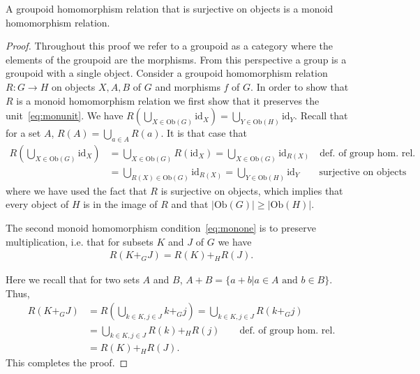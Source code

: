 \begin{lemma}
\label{lem:mongrphom}
A groupoid homomorphism relation that is surjective on objects is a monoid homomorphism relation.
\end{lemma}
\begin{proof}
Throughout this proof we refer to a groupoid as a category where the elements of the groupoid are the morphisms.  From this perspective a group is a groupoid with a single object. Consider a groupoid homomorphism relation $R:G\to H$ on objects $X,A,B$ of $G$ and morphisms $f$ of $G$.
In order to show that $R$ is a monoid homomorphism relation we first show that it preserves the unit~\eqref{eq:monunit}. We have $R(\bigcup_{X\in\mbox{Ob}(G)} \mbox{id}_X) = \bigcup_{Y\in\mbox{Ob}(H)} \mbox{id}_Y$. Recall that for a set $A$,  $R(A)=\bigcup_{a\in A} R(a)$. It is that case that
\begin{align}
R(\bigcup\nolimits_{X\in\mbox{Ob}(G)} \mbox{id}_X) &= \bigcup\nolimits_{X\in\mbox{Ob}(G)}R(\mbox{id}_X) = \bigcup\nolimits_{X\in\mbox{Ob}(G)}\mbox{id}_{R(X)} \quad \mbox{def. of group hom. rel.} \\
&= \bigcup\nolimits_{R(X)\in\mbox{Ob}(G)}\mbox{id}_{R(X)} = \bigcup\nolimits_{{Y\in\mbox{Ob}(H)}}\mbox{id}_{Y} \qquad \mbox{surjective on objects}
\end{align}
where we have used the fact that $R$ is surjective on objects, which implies that every object of $H$ is in the image of $R$ and that $|\mbox{Ob}(G)|\ge|\mbox{Ob}(H)|$.

The second monoid homomorphism condition~\eqref{eq:monone} is to preserve multiplication, i.e. that for subsets $K$ and $J$ of $G$ we have
\begin{align}
R(K+_GJ)=R(K)+_HR(J).
\end{align}

\noindent Here we recall that for two sets $A$ and $B$, $A+B=\{a + b | a \in A\mbox{ and } b \in B\}$. Thus,
\begin{align}
R(K+_GJ) &= R(\bigcup\nolimits_{k\in K,j\in J}k+_Gj) = \bigcup\nolimits_{k\in K,j\in J}R(k+_Gj) \\
&= \bigcup\nolimits_{k\in K,j\in J}R(k)+_HR(j) \qquad \mbox{def. of group hom. rel.}\\
&= R(K)+_HR(J).
\end{align}
This completes the proof.
\end{proof}

